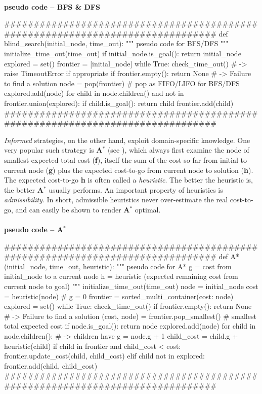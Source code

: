 \paragraph{}{\textbf{pseudo code -- BFS \& DFS}}
\begin{python}
###############################################################################
def blind_search(initial_node, time_out):
    """ pseudo code for BFS/DFS """
    initialize_time_out(time_out)
    if initial_node.is_goal():
        return initial_node
    explored = set()
    frontier = [initial_node]
    while True:
        check_time_out() # -> raise TimeoutError if appropriate
        if frontier.empty():
            return None # -> Failure to find a solution
        node = pop(frontier) # pop as FIFO/LIFO for BFS/DFS
        explored.add(node)
        for child in node.children() and not in frontier.union(explored):
            if child.is_goal():
                return child
            frontier.add(child)
###############################################################################
\end{python}
\black
\textit{Informed} strategies, on the other hand, exploit domain-specific knowledge. One very popular such strategy is \textbf{A$^{*}$} (see \cite{DBLP:journals/jacm/DechterP85}), which always first examine the node of smallest expected total cost (\textbf{f}), itself the sum of the cost-so-far from initial to current node (\textbf{g}) plus the expected cost-to-go from current node to solution (\textbf{h}). The expected cost-to-go \textbf{h} is often called a \textit{heuristic}. The better the heuristic is, the better \textbf{A$^{*}$} usually performs. An important property of heuristics is \textit{admissibility}. In short, admissible heuristics never over-estimate the real cost-to-go, and can easily be shown to render \textbf{A$^{*}$} optimal.
\afblue
\paragraph{}{\textbf{pseudo code -- A$^{*}$}}
\begin{python}
###############################################################################
def A*(initial_node, time_out, heuristic):
    """ pseudo code for A*
    g = cost from initial_node to a current node
    h = heuristic (expected remaining cost from current node to goal)
    """
    initialize_time_out(time_out)
    node = initial_node
    cost = heuristic(node) # g = 0
    frontier = sorted_multi_container({cost: {node}})
    explored = set()
    while True:
        check_time_out()
        if frontier.empty():
            return None # -> Failure to find a solution
        (cost, node) = frontier.pop_smallest() # smallest total expected cost
        if node.is_goal():
            return node
        explored.add(node)
        for child in node.children(): # -> children have g = node.g + 1
            child_cost = child.g + heuristic(child)
            if child in frontier and child_cost < cost:
                frontier.update_cost(child, child_cost)
            elif child not in explored:
                frontier.add(child, child_cost)
###############################################################################
\end{python}
\black

